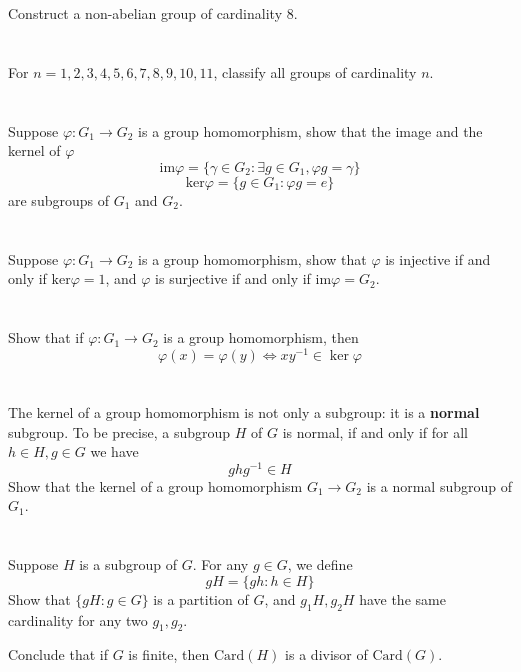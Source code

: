 \documentclass{report}
\begin{document}
\section{}
Construct a non-abelian group of cardinality $8$.
\section{}
For $n = 1,2,3,4,5,6,7,8,9,10,11$, classify all groups of cardinality $n$.
\section{}
Suppose $\varphi: G_1 \rightarrow G_2$ is a group homomorphism, show that the image and the kernel of $\varphi$
\[\text{im}\varphi = \{\gamma \in G_2: \exists g \in G_1, \varphi g =\gamma\}\]
\[\text{ker}\varphi = \{g \in G_1: \varphi g = e\}\]
are subgroups of $G_1$ and $G_2$.
\section{}
Suppose $\varphi: G_1 \rightarrow G_2$ is a group homomorphism, show that $\varphi$ is injective if and only if $\text{ker}\varphi = 1$, and $\varphi$ is surjective if and only if $\text{im}\varphi = G_2$.
\section{}
Show that if $\varphi:G_1\rightarrow G_2$ is a group homomorphism, then $$\varphi(x)=\varphi(y)\Leftrightarrow xy^{-1}\in \ker\varphi$$
\section{}
The kernel of a group homomorphism is not only a subgroup: it is a \textbf{normal} subgroup. To be precise, a subgroup $H$ of $G$ is normal, if and only if for all $h \in H, g \in G$ we have
\[ghg^{-1} \in H\]
Show that the kernel of a group homomorphism $G_1 \rightarrow G_2$ is a normal subgroup of $G_1$.
\section{}
Suppose $H$ is a subgroup of $G$. For any $g \in G$, we define
\[gH = \{gh:h \in H\}\]
Show that $\{gH: g \in G\}$ is a partition of $G$, and $g_1H, g_2H$ have the same cardinality for any two $g_1,g_2$.

Conclude that if $G$ is finite, then $\text{Card}(H)$ is a divisor of $\text{Card}(G)$.
\end{document}
